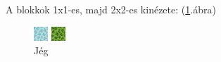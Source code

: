
A blokkok 1x1-es, majd 2x2-es kinézete:
(\ref{fig:block_image1}.ábra)

\begin{figure}[!htb]
  \includegraphics[width=\linewidth]{images/ice.png}
  \caption{Jég}\label{fig:block_image1}
\endminipage\hfill
{}
  \includegraphics[width=\linewidth]{images/swamp.png}

\end{figure}
